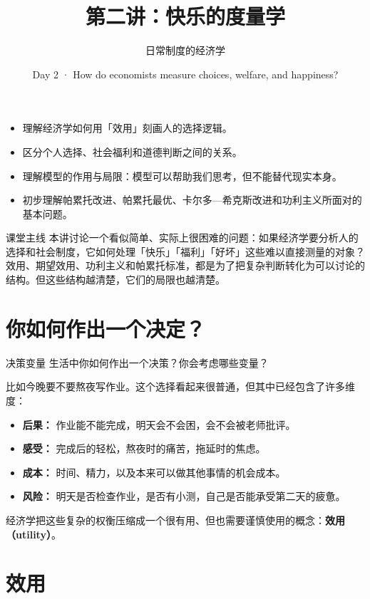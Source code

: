 \documentclass[10pt,a4paper]{ctexart}
\title{\vspace{-2em}\bfseries 第二讲：快乐的度量学}
\author{日常制度的经济学}
\date{Day 2 · How do economists measure choices, welfare, and happiness?}
\begin{document}
\maketitle
\thispagestyle{fancy}

\begin{goalsbox}
\begin{itemize}
  \item 理解经济学如何用「效用」刻画人的选择逻辑。
  \item 区分个人选择、社会福利和道德判断之间的关系。
  \item 理解模型的作用与局限：模型可以帮助我们思考，但不能替代现实本身。
  \item 初步理解帕累托改进、帕累托最优、卡尔多—希克斯改进和功利主义所面对的基本问题。
\end{itemize}
\end{goalsbox}

\begin{keybox}{课堂主线}
本讲讨论一个看似简单、实际上很困难的问题：如果经济学要分析人的选择和社会制度，它如何处理「快乐」「福利」「好坏」这些难以直接测量的对象？效用、期望效用、功利主义和帕累托标准，都是为了把复杂判断转化为可以讨论的结构。但这些结构越清楚，它们的局限也越清楚。
\end{keybox}

\section{你如何作出一个决定？}

\begin{discussionbox}{决策变量}
生活中你如何作出一个决策？你会考虑哪些变量？
\end{discussionbox}

比如今晚要不要熬夜写作业。这个选择看起来很普通，但其中已经包含了许多维度：
\begin{itemize}
  \item \textbf{后果：} 作业能不能完成，明天会不会困，会不会被老师批评。
  \item \textbf{感受：} 完成后的轻松，熬夜时的痛苦，拖延时的焦虑。
  \item \textbf{成本：} 时间、精力，以及本来可以做其他事情的机会成本。
  \item \textbf{风险：} 明天是否检查作业，是否有小测，自己是否能承受第二天的疲惫。
\end{itemize}

经济学把这些复杂的权衡压缩成一个很有用、但也需要谨慎使用的概念：\textbf{效用（utility）}。

\section{效用}
\end{document}
